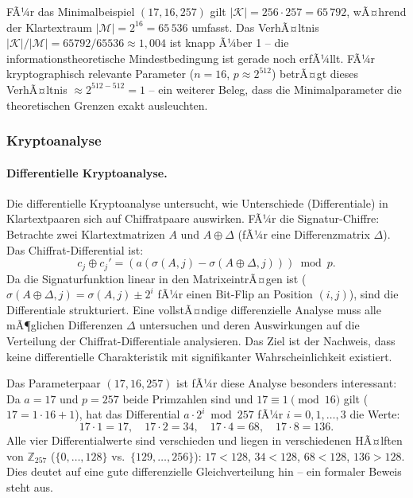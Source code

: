 ﻿\documentclass[a4paper,12pt]{scrreprt}
\theoremstyle{definition}
\begin{document}
FÃ¼r das Minimalbeispiel $(17, 16, 257)$ gilt $|\mathcal{K}| = 256 \cdot 257 = 65\,792$, wÃ¤hrend der Klartextraum $|\mathcal{M}| = 2^{16} = 65\,536$ umfasst. Das VerhÃ¤ltnis $|\mathcal{K}|/|\mathcal{M}| = 65792/65536 \approx 1{,}004$ ist knapp Ã¼ber 1 -- die informationstheoretische Mindestbedingung ist gerade noch erfÃ¼llt. FÃ¼r kryptographisch relevante Parameter ($n=16$, $p \approx 2^{512}$) betrÃ¤gt dieses VerhÃ¤ltnis $\approx 2^{512-512} = 1$ -- ein weiterer Beleg, dass die Minimalparameter die theoretischen Grenzen exakt ausleuchten.

\subsubsection{Kryptoanalyse}

\paragraph{Differentielle Kryptoanalyse.}
Die differentielle Kryptoanalyse \cite{BS93} untersucht, wie Unterschiede (Differentiale) in Klartextpaaren sich auf Chiffratpaare auswirken. FÃ¼r die Signatur-Chiffre: Betrachte zwei Klartextmatrizen $A$ und $A \oplus \Delta$ (fÃ¼r eine Differenzmatrix $\Delta$). Das Chiffrat-Differential ist:
\[
c_j \oplus c_j' = (a(\sigma(A,j) - \sigma(A\oplus\Delta,j)))\bmod p.
\]
Da die Signaturfunktion linear in den MatrixeintrÃ¤gen ist ($\sigma(A\oplus\Delta,j) = \sigma(A,j) \pm 2^i$ fÃ¼r einen Bit-Flip an Position $(i,j)$), sind die Differentiale strukturiert. Eine vollstÃ¤ndige differenzielle Analyse muss alle mÃ¶glichen Differenzen $\Delta$ untersuchen und deren Auswirkungen auf die Verteilung der Chiffrat-Differentiale analysieren. Das Ziel ist der Nachweis, dass keine differentielle Charakteristik mit signifikanter Wahrscheinlichkeit existiert.

Das Parameterpaar $(17, 16, 257)$ ist fÃ¼r diese Analyse besonders interessant: Da $a = 17$ und $p = 257$ beide Primzahlen sind und $17 \equiv 1 \pmod{16}$ gilt ($17 = 1 \cdot 16 + 1$), hat das Differential $a \cdot 2^i \bmod 257$ fÃ¼r $i = 0, 1, \ldots, 3$ die Werte:
\[
17 \cdot 1 = 17, \quad 17 \cdot 2 = 34, \quad 17 \cdot 4 = 68, \quad 17 \cdot 8 = 136.
\]
Alle vier Differentialwerte sind verschieden und liegen in verschiedenen HÃ¤lften von $\mathbb{Z}_{257}$ ($\{0,\ldots,128\}$ vs.\ $\{129,\ldots,256\}$): $17 < 128$, $34 < 128$, $68 < 128$, $136 > 128$. Dies deutet auf eine gute differenzielle Gleichverteilung hin -- ein formaler Beweis steht aus.
\end{document}

